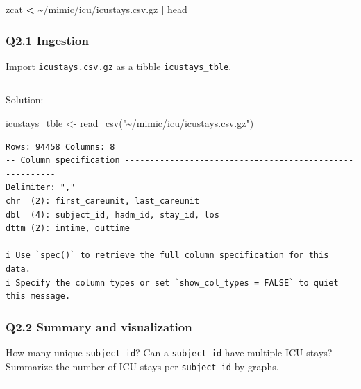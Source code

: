 \documentclass[
]{article}
\newenvironment{Shaded}{\begin{snugshade}}{\end{snugshade}}
\newcommand{\FunctionTok}[1]{\textcolor[rgb]{0.00,0.00,0.00}{#1}}
\newcommand{\KeywordTok}[1]{\textcolor[rgb]{0.13,0.29,0.53}{\textbf{#1}}}
\newcommand{\NormalTok}[1]{\textcolor[rgb]{0.00,0.00,0.00}{#1}}
\newcommand{\OperatorTok}[1]{\textcolor[rgb]{0.81,0.36,0.00}{\textbf{#1}}}
\newcommand{\OtherTok}[1]{\textcolor[rgb]{0.56,0.35,0.01}{#1}}
\newcommand{\StringTok}[1]{\textcolor[rgb]{0.31,0.60,0.02}{#1}}
\begin{document}
\begin{Shaded}
\begin{Highlighting}[]
\FunctionTok{zcat} \OperatorTok{\textless{}}\NormalTok{ \textasciitilde{}/mimic/icu/icustays.csv.gz }\KeywordTok{|} \FunctionTok{head}
\end{Highlighting}
\end{Shaded}

\hypertarget{q2.1-ingestion}{%
\subsubsection{Q2.1 Ingestion}\label{q2.1-ingestion}}

Import \texttt{icustays.csv.gz} as a tibble \texttt{icustays\_tble}.

\begin{center}\rule{0.5\linewidth}{0.5pt}\end{center}

Solution:

\begin{Shaded}
\begin{Highlighting}[]
\NormalTok{icustays\_tble }\OtherTok{\textless{}{-}} \FunctionTok{read\_csv}\NormalTok{(}\StringTok{"\textasciitilde{}/mimic/icu/icustays.csv.gz"}\NormalTok{)}
\end{Highlighting}
\end{Shaded}

\begin{verbatim}
Rows: 94458 Columns: 8
-- Column specification --------------------------------------------------------
Delimiter: ","
chr  (2): first_careunit, last_careunit
dbl  (4): subject_id, hadm_id, stay_id, los
dttm (2): intime, outtime

i Use `spec()` to retrieve the full column specification for this data.
i Specify the column types or set `show_col_types = FALSE` to quiet this message.
\end{verbatim}

\hypertarget{q2.2-summary-and-visualization}{%
\subsubsection{Q2.2 Summary and
visualization}\label{q2.2-summary-and-visualization}}

How many unique \texttt{subject\_id}? Can a \texttt{subject\_id} have
multiple ICU stays? Summarize the number of ICU stays per
\texttt{subject\_id} by graphs.

\begin{center}\rule{0.5\linewidth}{0.5pt}\end{center}
\end{document}
